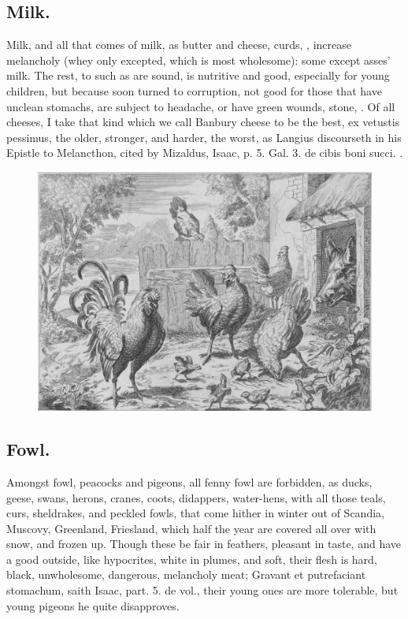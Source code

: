 {\subsection{Milk.}
Milk, and all that comes of milk, as butter and cheese, curds,
\etc{}, increase melancholy (whey only excepted, which is most wholesome):
some except asses' milk. The rest, to such as are sound, is
nutritive and good, especially for young children, but because soon
turned to corruption, not good for those that have unclean
stomachs, are subject to headache, or have green wounds, stone, \etc{}. Of
all cheeses, I take that kind which we call Banbury cheese to be the
best, ex vetustis pessimus, the older, stronger, and harder, the worst,
as Langius discourseth in his Epistle to Melancthon, cited by Mizaldus,
Isaac, p. 5. Gal. 3. de cibis boni succi. \etc{}.

\begin{figure}[H]
  \centering
  \includegraphics[keepaspectratio,width=\textwidth]{figures/chickens-small.jpg}
  \caption{}
  \label{fig:chickens}
\end{figure}

\subsection{Fowl.}
Amongst fowl, peacocks and pigeons, all fenny fowl are
forbidden, as ducks, geese, swans, herons, cranes, coots, didappers,
water-hens, with all those teals, curs, sheldrakes, and peckled fowls,
that come hither in winter out of Scandia, Muscovy, Greenland,
Friesland, which half the year are covered all over with snow, and
frozen up. Though these be fair in feathers, pleasant in taste, and
have a good outside, like hypocrites, white in plumes, and soft, their
flesh is hard, black, unwholesome, dangerous, melancholy meat; Gravant
et putrefaciant stomachum, saith Isaac, part. 5. de vol., their young
ones are more tolerable, but young pigeons he quite disapproves.

}
